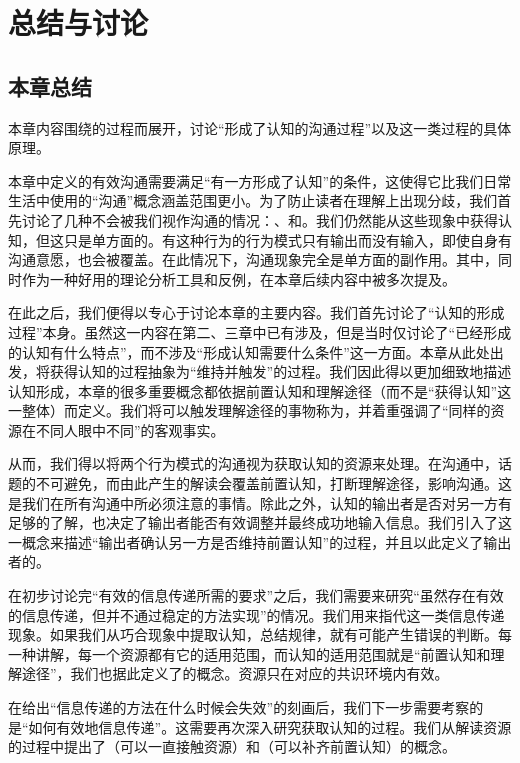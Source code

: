 \section{总结与讨论}
\subsection{本章总结}
本章内容围绕的过程而展开，讨论“形成了认知的沟通过程”以及这一类过程的具体原理。

本章中定义的有效沟通需要满足“有一方形成了认知”的条件，这使得它比我们日常生活中使用的“沟通”概念涵盖范围更小。为了防止读者在理解上出现分歧，我们首先讨论了几种不会被我们视作沟通的情况：、和。我们仍然能从这些现象中获得认知，但这只是单方面的。有这种行为的行为模式只有输出而没有输入，即使自身有沟通意愿，也会被覆盖。在此情况下，沟通现象完全是单方面的副作用。其中，同时作为一种好用的理论分析工具和反例，在本章后续内容中被多次提及。

在此之后，我们便得以专心于讨论本章的主要内容。我们首先讨论了“认知的形成过程”本身。虽然这一内容在第二、三章中已有涉及，但是当时仅讨论了“已经形成的认知有什么特点”，而不涉及“形成认知需要什么条件”这一方面。本章从此处出发，将获得认知的过程抽象为“维持并触发”的过程。我们因此得以更加细致地描述认知形成，本章的很多重要概念都依据前置认知和理解途径（而不是“获得认知”这一整体）而定义。我们将可以触发理解途径的事物称为，并着重强调了“同样的资源在不同人眼中不同”的客观事实。

从而，我们得以将两个行为模式的沟通视为获取认知的资源来处理。在沟通中，话题的不可避免，而由此产生的解读会覆盖前置认知，打断理解途径，影响沟通。这是我们在所有沟通中所必须注意的事情。除此之外，认知的输出者是否对另一方有足够的了解，也决定了输出者能否有效调整并最终成功地输入信息。我们引入了这一概念来描述“输出者确认另一方是否维持前置认知”的过程，并且以此定义了输出者的。

在初步讨论完“有效的信息传递所需的要求”之后，我们需要来研究“虽然存在有效的信息传递，但并不通过稳定的方法实现”的情况。我们用来指代这一类信息传递现象。如果我们从巧合现象中提取认知，总结规律，就有可能产生错误的判断。每一种讲解，每一个资源都有它的适用范围，而认知的适用范围就是“前置认知和理解途径”，我们也据此定义了的概念。资源只在对应的共识环境内有效。

在给出“信息传递的方法在什么时候会失效”的刻画后，我们下一步需要考察的是“如何有效地信息传递”。这需要再次深入研究获取认知的过程。我们从解读资源的过程中提出了（可以一直接触资源）和（可以补齐前置认知）的概念。

